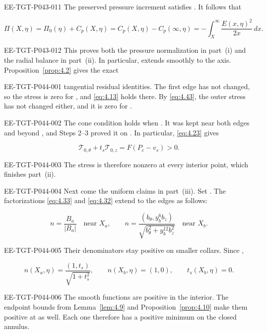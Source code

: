 \begin{EESegment}{EE-TGT-P043-011}
The preserved pressure increment satisfies
. It follows that
\end{EESegment}
\[
\Pi(X,\eta)=\Pi_0(\eta)+C_p(X,\eta)
=C_p(X,\eta)-C_p(\infty,\eta)
=-\int_X^\infty\frac{E(x,\eta)^2}{2x}\,dx.
\]
\begin{EESegment}{EE-TGT-P043-012}
This proves both the pressure normalization in part~\textup{(i)} and the radial balance in
part~\textup{(ii)}. In particular,
 extends smoothly to the axis.
Proposition~\ref{prop:4.2} gives the exact
\end{EESegment}
%
\begin{EESegment}{EE-TGT-P044-001}
tangential residual identities. The first edge has not changed, so the stress is zero for
, and \eqref{eq:4.13} holds there. By \eqref{eq:4.43}, the outer
stress has not changed either, and it is zero for
.
\end{EESegment}

\begin{EESegment}{EE-TGT-P044-002}
The cone condition holds when . It was kept near both edges and
beyond , and Steps 2--3 proved it on
. In particular, \eqref{eq:4.23} gives
\end{EESegment}
\[
\mathcal T_{0,\theta}+t_s\mathcal T_{0,z}=F(P_c-v_s)>0.
\]
\begin{EESegment}{EE-TGT-P044-003}
The stress is therefore nonzero at every interior point, which finishes part~\textup{(ii)}.
\end{EESegment}

\begin{EESegment}{EE-TGT-P044-004}
Next come the uniform claims in part~\textup{(iii)}. Set
. The factorizations
\eqref{eq:4.33} and \eqref{eq:4.32} extend
 to the edges as follows:
\end{EESegment}
\[
n=\frac{B_a}{|B_a|}\quad\text{near }X_a,
\qquad
n=\frac{(b_\theta,y_b^6b_z)}{\sqrt{b_\theta^2+y_b^{12}b_z^2}}
\quad\text{near }X_b.
\]
\begin{EESegment}{EE-TGT-P044-005}
Their denominators stay positive on smaller collars. Since
,
\end{EESegment}
\[
n(X_a,\eta)=\frac{(1,t_s)}{\sqrt{1+t_s^2}},
\qquad n(X_b,\eta)=(1,0),
\qquad t_s(X_b,\eta)=0.
\]
\begin{EESegment}{EE-TGT-P044-006}
The smooth functions  are positive in the interior. The endpoint
bounds from Lemma~\ref{lem:4.9} and Proposition~\ref{prop:4.10} make them positive at
 as well. Each one therefore has a positive minimum on the closed
annulus.
\end{EESegment}

